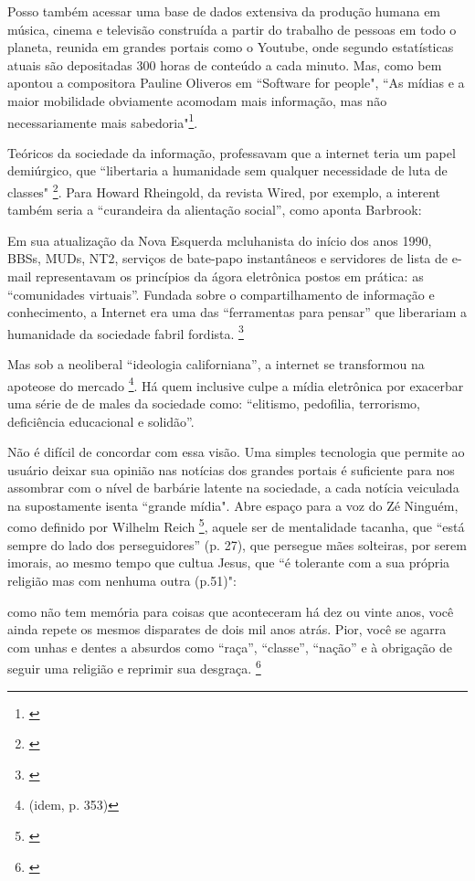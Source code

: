 Posso também acessar uma base de dados extensiva da produção humana em música, cinema e televisão construída a partir do trabalho de pessoas em todo o planeta, reunida em grandes portais como o Youtube, onde segundo estatísticas atuais são depositadas 300 horas de conteúdo a cada minuto. Mas, como bem apontou a compositora Pauline Oliveros em ``Software for people", ``As mídias e a maior mobilidade obviamente acomodam mais informação, mas não necessariamente mais sabedoria"\footnote{\cite[179]{Oliveros2012}}. 

Teóricos da sociedade da informação, professavam que a internet teria um papel demiúrgico, que ``libertaria a humanidade sem qualquer necessidade de luta de classes" \footnote{\cite[275]{Barbrook2009}}. Para Howard Rheingold, da revista Wired, por exemplo, a interent também seria a ``curandeira da alientação social'', como aponta Barbrook:


\begin{citacao}
Em sua atualização da Nova Esquerda mcluhanista do início dos anos 1990, BBSs, MUDs, NT2, serviços de bate-papo instantâneos e servidores de lista de e-mail representavam os princípios da ágora eletrônica postos em prática: as “comunidades virtuais”. Fundada sobre o compartilhamento de informação e conhecimento, a Internet era uma das “ferramentas para pensar” que liberariam a humanidade da sociedade fabril fordista. \footnote{\cite[350]{Barbrook2009}}
\end{citacao}

Mas sob a neoliberal ``ideologia californiana'', a internet se transformou na apoteose do mercado \footnote{(idem, p. 353)}. Há quem inclusive culpe a mídia eletrônica por exacerbar uma série de de males da sociedade como: ``elitismo, pedofilia, terrorismo, deficiência educacional e solidão''. 

Não é difícil de concordar com essa visão. Uma simples tecnologia que permite ao usuário deixar sua opinião nas notícias dos grandes portais é suficiente para nos assombrar com o nível de barbárie latente na sociedade, a cada notícia veiculada na supostamente isenta ``grande mídia". Abre espaço para a voz do Zé Ninguém, como definido por Wilhelm Reich \footnote{\cite{reich1998escute}}, aquele ser de mentalidade tacanha, que ``está sempre do lado dos perseguidores'' (p. 27), que persegue mães solteiras, por serem imorais, ao mesmo tempo que cultua Jesus, que ``é tolerante com a sua própria religião mas com nenhuma outra (p.51)":

\begin{citacao}
como não tem memória para coisas que aconteceram há dez ou vinte anos, você ainda repete os mesmos disparates de dois mil anos atrás. Pior, você se agarra com unhas e dentes a absurdos como ``raça'', ``classe'', ``nação'' e à obrigação de seguir uma religião e reprimir sua desgraça. \footnote{\cite[101]{reich1998escute}}
\end{citacao}

